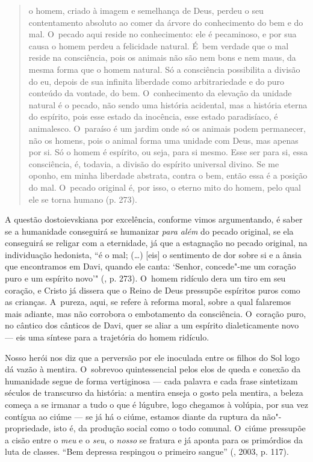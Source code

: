 \begin{quote}
o homem, criado à imagem e semelhança de Deus, perdeu o seu
contentamento absoluto ao comer da árvore do conhecimento do bem e do
mal. O~pecado aqui reside no conhecimento: ele é pecaminoso, e por sua
causa o homem perdeu a felicidade natural. É~bem verdade que o mal
reside na consciência, pois os animais não são nem bons e nem maus, da
mesma forma que o homem natural. Só a consciência possibilita a divisão
do eu, depois de sua infinita liberdade como arbitrariedade e do puro
conteúdo da vontade, do bem. O~conhecimento da elevação da unidade
natural é o pecado, não sendo uma história acidental, mas a história
eterna do espírito, pois esse estado da inocência, esse estado
paradisíaco, é animalesco. O~paraíso é um jardim onde só os animais
podem permanecer, não os homens, pois o animal forma uma unidade com
Deus, mas apenas por si. Só o homem é espírito, ou seja, para si mesmo.
Esse ser para si, essa consciência, é, todavia, a divisão do espírito
universal divino. Se me oponho, em minha liberdade abstrata, contra o
bem, então essa é a posição do mal. O~pecado original é, por isso, o
eterno mito do homem, pelo qual ele se torna humano (p. 273).
\end{quote}

A questão dostoievskiana por excelência, conforme vimos argumentando, é
saber se a humanidade conseguirá se humanizar \emph{para além} do pecado
original, se ela conseguirá se religar com a eternidade, já que a
estagnação no pecado original, na individuação hedonista, ``é o mal;
(\ldots) {[}eis{]} o sentimento de dor sobre si e a ânsia que encontramos
em Davi, quando ele canta: `Senhor, concede"-me um coração puro e um
espírito novo'" (, p. 273). O~homem ridículo dera um tiro em seu
coração, e Cristo já dissera que o Reino de Deus pressupõe espíritos
puros como as crianças. A~pureza, aqui, se refere à reforma moral, sobre
a qual falaremos mais adiante, mas não corrobora o embotamento da
consciência. O~coração puro, no cântico dos cânticos de Davi, quer se
aliar a um espírito dialeticamente novo --- eis uma síntese para a
trajetória do homem ridículo.

Nosso herói nos diz que a perversão por ele inoculada entre os filhos do
Sol logo dá vazão à mentira. O~sobrevoo quintessencial pelos elos de
queda e conexão da humanidade segue de forma vertiginosa --- cada palavra
e cada frase sintetizam séculos de transcurso da história: a mentira
enseja o gosto pela mentira, a beleza começa a se irmanar a tudo o que é
lúgubre, logo chegamos à volúpia, por sua vez contígua ao ciúme --- se já
há o ciúme, estamos diante da ruptura da não"-propriedade, isto é, da
produção social como o todo comunal. O~ciúme pressupõe a cisão entre o
\emph{meu} e o \emph{seu}, o \emph{nosso} se fratura e já aponta para os
primórdios da luta de classes. ``Bem depressa respingou o primeiro
sangue'' (, 2003, p. 117).

